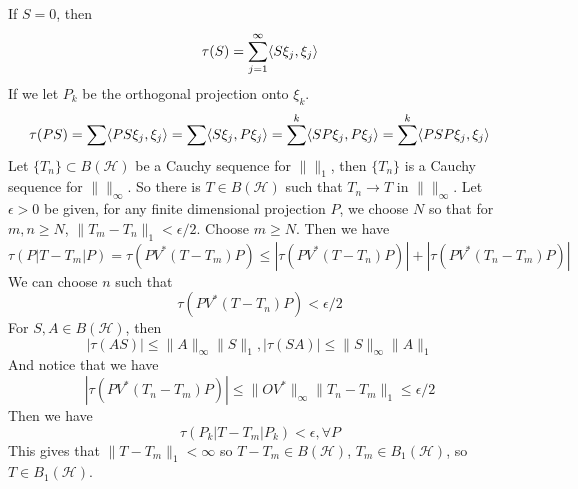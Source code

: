 If $S=0$, then 
\begin{equation*}
    \tau(S)=\sum_{j=1}^\infty\langle S\xi_j,\xi_j\rangle
\end{equation*}
If we let $P_k$ be the orthogonal projection onto $\xi_k$. 
\begin{equation*}
    \tau(PS)=\sum\langle PS\xi_j, \xi_j\rangle=\sum\langle S\xi_j, P\xi_j\rangle=\sum^k\langle SP\xi_j, P\xi_j\rangle=\sum^k\langle PSP\xi_j, \xi_j\rangle
\end{equation*}
Let $\{T_n\}\subset B(\mathcal{H})$ be a Cauchy sequence for $\| \|_1$, then $\{T_n\}$ is a Cauchy sequence for $\| \|_\infty$. So there is $T\in B(\mathcal{H})$ such that $T_n\to T$ in $\| \|_\infty$. Let $\epsilon>0$ be given, for any finite dimensional projection $P$, we choose $N$ so that for $m,n\geq N$, $\|T_m-T_n\|_1<\epsilon/2$. Choose $m\geq N$. Then we have 
\begin{equation*}
    \tau(P|T-T_m|P)=\tau(PV^*(T-T_m)P)\leq|\tau(PV^*(T-T_n)P)|+|\tau(PV^*(T_n-T_m)P)|
\end{equation*}
We can choose $n$ such that 
\begin{equation*}
    \tau(PV^*(T-T_n)P)<\epsilon/2
\end{equation*}
For $S,A\in B(\mathcal{H})$, then 
\begin{equation*}
    |\tau(AS)|\leq\|A\|_\infty\|S\|_1, |\tau(SA)|\leq\|S\|_\infty\|A\|_1
\end{equation*}
And notice that we have 
\begin{equation*}
    |\tau(PV^*(T_n-T_m)P)|\leq\|OV^*\|_\infty\|T_n-T_m\|_1\leq\epsilon/2
\end{equation*}
Then we have 
\begin{equation*}
    \tau(P_k|T-T_m|P_k)<\epsilon, \forall P
\end{equation*}
This gives that $\|T-T_m\|_1<\infty$ so $T-T_m\in B(\mathcal{H})$, $T_m\in B_1(\mathcal{H})$, so $T\in B_1(\mathcal{H})$.

